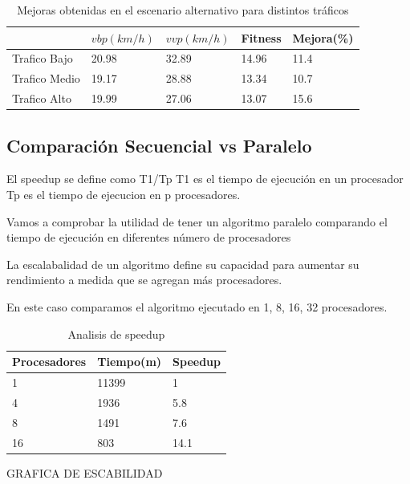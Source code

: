 \begin{table}[h]
	\renewcommand{\arraystretch}{1.2}
	\caption{Mejoras obtenidas en el escenario alternativo para distintos tráficos }
	\label{table:mejoras_trafico_alternativo}
	\centering
	\begin{tabular}{p{3.5cm}p{2.5cm}p{2.5cm}p{2cm}p{2cm} }
		\hline
		&
		$vbp(km/h)$& 
		$vvp(km/h)$ & 
		Fitness &
		Mejora(\%)
		\\ 
		\hline

		Trafico Bajo & 20.98  & 32.89 & 14.96 & 11.4\\
		Trafico Medio  & 19.17  & 28.88& 13.34 & 10.7\\	
		Trafico Alto  & 19.99  & 27.06& 13.07 & 15.6\\		
		\hline
	\end{tabular}
\end{table}


\subsection{Comparación Secuencial vs  Paralelo}

El speedup se define como T1/Tp
T1 es el tiempo de ejecución en un procesador
Tp es el tiempo de ejecucion en p procesadores.


Vamos a comprobar la utilidad de tener un algoritmo paralelo comparando el tiempo de ejecución en diferentes número de procesadores

La escalabalidad de un algoritmo define su capacidad para aumentar su rendimiento a medida que se agregan más procesadores.

En este caso comparamos el algoritmo ejecutado en 1, 8, 16, 32 procesadores.



\begin{table}[h]
	\renewcommand{\arraystretch}{1.2}
	\caption{Analisis de speedup }
	\label{table:analisis_speedup}
	\centering
	\begin{tabular}{p{2.5cm}p{2.5cm}p{2.5cm} }
		\hline

		Procesadores& 
		Tiempo(m) & 
		Speedup 
		\\ 
		\hline
		1  & 11399 & 1\\
		4  & 1936 & 5.8 \\
		8  & 1491 & 7.6 \\
		16  & 803 & 14.1 \\
		\hline
	\end{tabular}
\end{table}
GRAFICA DE ESCABILIDAD

